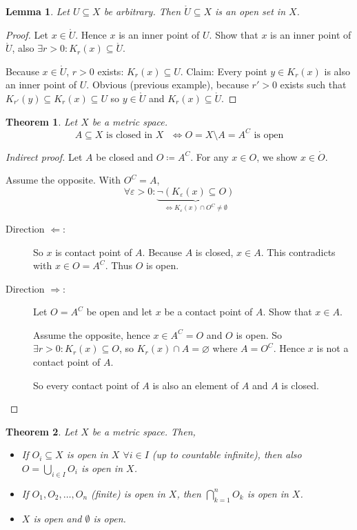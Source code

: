 \documentclass{article}
\newtheorem{theorem}{Theorem}  \numberwithin{theorem}{section}
\newtheorem{lemma}{Lemma}  \numberwithin{lemma}{section}
\begin{document}
\begin{lemma}
  Let $U \subseteq X$ be arbitrary. Then $\mathring{U} \subseteq X$ is an open set in $X$.
\end{lemma}
\begin{proof}
  Let $x \in \mathring{U}$. Hence $x$ is an inner point of $U$.
  Show that $x$ is an inner point of $\mathring{U}$, also $\exists r > 0: K_r(x) \subseteq \mathring{U}$.

  Because $x \in \mathring U$, $r > 0$ exists: $K_r(x) \subseteq U$.
  Claim: Every point $y \in K_r(x)$ is also an inner point of $U$.
  Obvious (previous example), because $r' > 0$ exists such that
  $K_{r'}(y) \subseteq K_r(x) \subseteq U$ so $y \in \mathring U$ and $K_r(x) \subseteq \mathring U$.
\end{proof}

\begin{theorem}
  \label{saetzchen1}
  Let $X$ be a metric space.
  \[ A \subseteq X \text{ is closed in $X$ } \iff O = X \setminus A = A^C \text{ is open} \]
\end{theorem}

\begin{proof}[Indirect proof]
  Let $A$ be closed and $O \coloneqq A^C$. For any $x \in O$, we show $x \in \mathring O$.

  Assume the opposite. With $O^C = A$,
  \[ \forall \varepsilon > 0: \underbrace{\neg \left(K_{\varepsilon}(x) \subseteq O\right)}_{\iff K_{\varepsilon}(x) \cap O^C \neq \emptyset} \]

  \begin{description}
    \item[Direction $\mathbf\Leftarrow$:]
      So $x$ is contact point of $A$.
      Because $A$ is closed, $x \in A$.
      This contradicts with $x \in O = A^C$. Thus $O$ is open.

    \item[Direction $\mathbf\Rightarrow$:]
      Let $O = A^C$ be open and let $x$ be a contact point of $A$. Show that $x \in A$.

      Assume the opposite, hence $x \in A^C = O$ and $O$ is open.
      So $\exists r > 0: K_r(x) \subseteq O$, so $K_r(x) \cap A = \diameter$ where $A = O^C$.
      Hence $x$ is not a contact point of $A$.

      So every contact point of $A$ is also an element of $A$ and $A$ is closed.
  \end{description}
\end{proof}

\begin{theorem}
  \label{satz2}
  Let $X$ be a metric space. Then,
  \begin{itemize}
    \item
      If $O_i \subseteq X$ is open in $X$ $\forall i \in I$ (up to countable infinite),
      then also $O = \bigcup_{i \in I} O_i$ is open in $X$.
    \item
      If $O_1, O_2, \dots, O_n$ (finite) is open in $X$, then $\bigcap_{k=1}^n O_k$ is open in $X$.
    \item
      $X$ is open and $\emptyset$ is open.
  \end{itemize}
\end{theorem}
\end{document}
